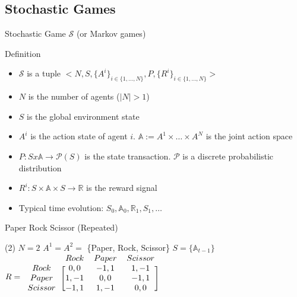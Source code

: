 \documentclass[presentation, 8pt]{beamer}\mode<presentation>{\usetheme{AMSBolognaFC}}
\begin{document}
\subsection{Stochastic Games}
\begin{frame}[c]{Stochastic Game $\mathcal{S}$ (or Markov games)}
	\begin{alertblock}{Definition}
		\begin{itemize}
			\item $\mathcal{S}$ is a tuple $<N, S, \{A^i\}_{i \in \{ 1, \dots, N\}}, P, \{R^i\}_{i \in \{ 1, \dots, N\}}>$
			\item $N$ is the number of agents ($|N| > 1 $)
			\item $S$ is the global environment state
			\item $A^i$ is the action state of agent $i$. $\mathbb{A} := A^1 \times \dots\times A^N$ is the joint action space
			\item $P: S x \mathbb{A} \rightarrow \mathcal{P}(S)$ is the state transaction. $\mathcal{P}$ is a discrete probabilistic distribution %
			\item $R^i: S \times \mathbb{A} \times S \rightarrow \mathbb{R}$ is the reward signal
			\item Typical time evolution: $ S_0, \mathbb{A}_0, \mathbb{R}_1, S_1, \dots  $
		\end{itemize}
	\end{alertblock}
	\begin{exampleblock}{Paper Rock Scissor (Repeated)}
		\begin{tasks}(2)
			\task $N = 2$
			\task $A^1 = A^2 = $ \{Paper, Rock, Scissor\}
			\task $S = \{ \mathbb{A}_{t-1} \} $
			\task $R = \begin{blockarray}{cccc}
        & Rock & Paper & Scissor \\
      \begin{block}{c[ccc]}
        Rock    & 0, 0  & -1, 1 & 1, -1 \\
        Paper   & 1, -1 & 0, 0  & -1, 1 \\
        Scissor & -1, 1 & 1, -1 & 0, 0 \\
      \end{block}
    \end{blockarray}$
		\end{tasks}
	\end{exampleblock}
\end{frame}	
\end{document}
